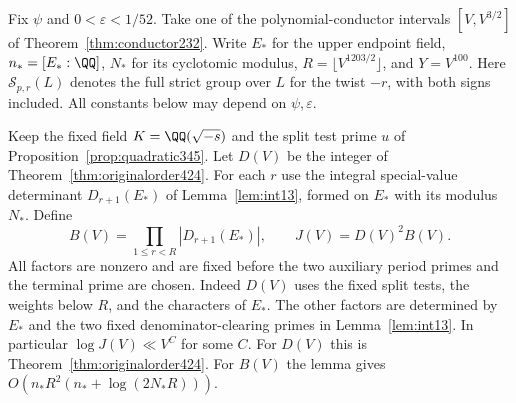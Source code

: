\documentclass[a4paper,11pt]{article}
\theoremstyle{definition}
\theoremstyle{remark}
\numberwithin{equation}{section}
\begin{document}
Fix \(\psi\) and \(0<\varepsilon<1/52\). Take one of the
polynomial-conductor intervals \([V,V^{3/2}]\) of
Theorem~\ref{thm:conductor232}. Write \(E_*\) for the upper
endpoint field, \(n_*=[E_*:\QQ]\), \(N_*\) for its cyclotomic
modulus, \(R=\lfloor V^{1203/2}\rfloor\), and \(Y=V^{100}\).
Here \(\mathcal S_{p,r}(L)\) denotes the full strict group over
\(L\) for the twist \(-r\), with both signs included.
All constants below may depend on \(\psi,\varepsilon\).

Keep the fixed field \(K=\QQ(\sqrt{-s})\) and the split test
prime \(u\) of Proposition~\ref{prop:quadratic345}. Let \(D(V)\)
be the integer of Theorem~\ref{thm:originalorder424}. For each
\(r\) use the integral special-value determinant
\(D_{r+1}(E_*)\) of Lemma~\ref{lem:int13}, formed on \(E_*\) with
its modulus \(N_*\). Define
\[
 B(V)=\prod_{1\le r<R}|D_{r+1}(E_*)|,\qquad
                 J(V)=D(V)^2 B(V).
\]
All factors are nonzero and are fixed before the two auxiliary
period primes and the terminal prime are chosen. Indeed \(D(V)\)
uses the fixed split tests, the weights below \(R\), and the
characters of \(E_*\). The other factors are determined by \(E_*\)
and the two fixed denominator-clearing primes in
Lemma~\ref{lem:int13}. In particular \(\log J(V)\ll V^C\)
for some \(C\). For \(D(V)\) this is
Theorem~\ref{thm:originalorder424}. For \(B(V)\) the lemma gives
\(O(n_*R^2(n_*+\log(2N_*R)))\).
\end{document}
